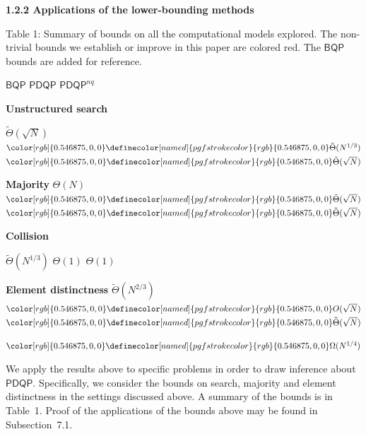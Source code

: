 \documentclass[10pt,a4paper]{article}
\begin{document}




\par\medskip\noindent\textbf{
1.2.2 Applications of the lower-bounding methods}\par



Table 1: Summary of bounds on all the computational models explored. The non-trivial bounds we establish or improve in this paper are colored red. The $\mathsf{BQP}$ bounds are added for reference.




 
$\mathsf{BQP}$ 
$\mathsf{PDQP}$ 
$\mathsf{PDQP}^{nq}$ 
\par



 \textbf{Unstructured search}
 
$\tilde{\Theta}(\sqrt{N})$ 
$\color[rgb]{0.546875,0,0}\definecolor[named]{pgfstrokecolor}{rgb}{0.546875,0,0}\tilde{\Theta}(N^{1/3})$ 
$\color[rgb]{0.546875,0,0}\definecolor[named]{pgfstrokecolor}{rgb}{0.546875,0,0}\tilde{\Theta}(\sqrt{N})$ 
\par


\textbf{Majority} 
$\Theta(N)$ 
$\color[rgb]{0.546875,0,0}\definecolor[named]{pgfstrokecolor}{rgb}{0.546875,0,0}\tilde{\Theta}(\sqrt{N})$ 
$\color[rgb]{0.546875,0,0}\definecolor[named]{pgfstrokecolor}{rgb}{0.546875,0,0}\tilde{\Theta}(\sqrt{N})$ 
\par



\textbf{Collision}
 
$\tilde{\Theta}(N^{1/3})$ 
$\Theta(1)$ 
$\Theta(1)$ 
\par


\textbf{Element distinctness} 
$\tilde{\Theta}(N^{2/3})$ 
$\color[rgb]{0.546875,0,0}\definecolor[named]{pgfstrokecolor}{rgb}{0.546875,0,0}O(\sqrt{N})$ 
$\color[rgb]{0.546875,0,0}\definecolor[named]{pgfstrokecolor}{rgb}{0.546875,0,0}\tilde{\Theta}(\sqrt{N})$ 
\par


$\color[rgb]{0.546875,0,0}\definecolor[named]{pgfstrokecolor}{rgb}{0.546875,0,0}\Omega(N^{1/4})$ 
\par







We apply the results above to specific problems in order to draw inference about $\mathsf{PDQP}$. Specifically, we consider the bounds on search, majority and element distinctness in the settings discussed above. A summary of the bounds is in Table 1. Proof of the applications of the bounds above may be found in Subsection 7.1.\par
\end{document}
